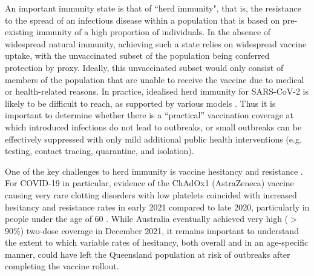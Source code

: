 \documentclass[article, a4, authoryear]{elsarticle}
\begin{document}
An important immunity state is that of ``herd immunity", that is, the resistance to the spread of an infectious disease within a population that is based on pre-existing immunity of a high proportion of
individuals. In the absence of widespread natural immunity, achieving such a state relies on widespread vaccine uptake, with the unvaccinated subset of the population being conferred protection by proxy. Ideally, this unvaccinated subset would only consist of members of the population that are unable to receive the vaccine due to medical or health-related reasons. In practice, idealised herd immunity for SARS-CoV-2 is likely to be difficult to reach, as supported by various models \cite{McBryde_2021, caldwella2021vaccines,adegboye2021change, zachreson2021will, chang2021nowcasting, abeysuriyaprojected, macintyre2021modelling, doherty2021, grout2021estimating, blakely2021association, moore2021vaccination, jentsch2021prioritising, Bablani2021}. Thus it is important to determine whether there is a ``practical'' vaccination coverage at which introduced infections do not lead to outbreaks, or small outbreaks can be effectively suppressed with only mild additional public health interventions (e.g. testing, contact tracing, quarantine, and isolation). 

One of the key challenges to herd immunity is vaccine hesitancy and resistance \cite{kucharski_fakenews_2016,vosoughi_online_2018,Monti_news_2019,lazarus_global_2021}. For COVID-19 in particular, evidence of the ChAdOx1 (AstraZeneca) vaccine causing very rare clotting disorders with low platelets \cite{az_clot_2021} coincided with increased hesitancy and resistance rates in early 2021 compared to late 2020, particularly in people under the age of 60 \cite{edwards2021,biddle_change_2021}. While Australia eventually achieved very high ($>$90\%) two-dose coverage in December 2021, it remains important to understand the extent to which variable rates of hesitancy, both overall and in an age-specific manner, could have left the Queensland population at risk of outbreaks after completing the vaccine rollout. 
\end{document}
